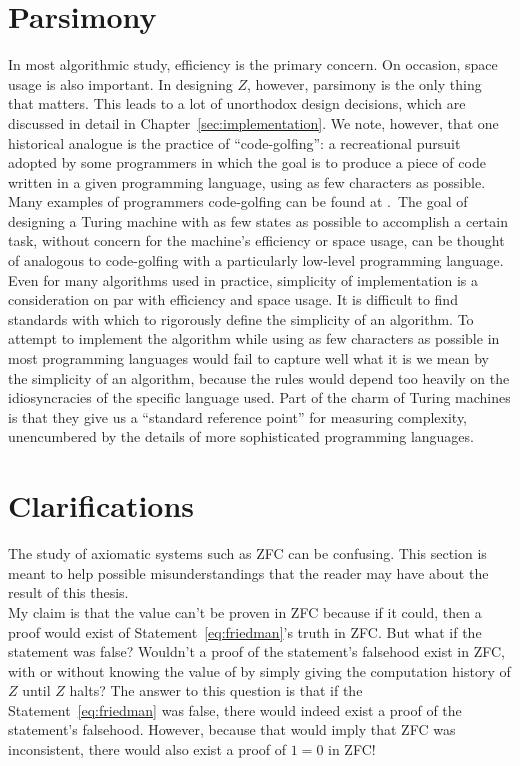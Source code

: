 \section{Parsimony}

In most algorithmic study, efficiency is the primary concern. On occasion, space usage is also important. In designing $Z$, however, parsimony is the only thing that matters. This leads to a lot of unorthodox design decisions, which are discussed in detail in Chapter~\ref{sec:implementation}. We note, however, that one historical analogue is the practice of ``code-golfing'': a recreational pursuit adopted by some programmers in which the goal is to produce a piece of code written in a given programming language, using as few characters as possible. Many examples of programmers code-golfing can be found at \cite{codegolf}.~The goal of designing a Turing machine with as few states as possible to accomplish a certain task, without concern for the machine's efficiency or space usage, can be thought of analogous to code-golfing with a particularly low-level programming language. \\

Even for many algorithms used in practice, simplicity of implementation is a consideration on par with efficiency and space usage. It is difficult to find standards with which to rigorously define the simplicity of an algorithm. To attempt to implement the algorithm while using as few characters as possible in most programming languages would fail to capture well what it is we mean by the simplicity of an algorithm, because the rules would depend too heavily on the idiosyncracies of the specific language used. Part of the charm of Turing machines is that they give us a ``standard reference point'' for measuring complexity, unencumbered by the details of more sophisticated programming languages.

\section{Clarifications} \label{sec:faq}

The study of axiomatic systems such as ZFC can be confusing. This section is meant to help possible misunderstandings that the reader may have about the result of this thesis. \\

My claim is that the value \bbstatenum can't be proven in ZFC because if it could, then a proof would exist of Statement~\ref{eq:friedman}'s truth in ZFC. But what if the statement was false? Wouldn't a proof of the statement's falsehood exist in ZFC, with or without knowing the value of \bbstatenumcomma by simply giving the computation history of $Z$ until $Z$ halts? The answer to this question is that if the Statement~\ref{eq:friedman} was false, there would indeed exist a proof of the statement's falsehood. However, because that would imply that ZFC was inconsistent, there would also exist a proof of $1=0$ in ZFC! \\

